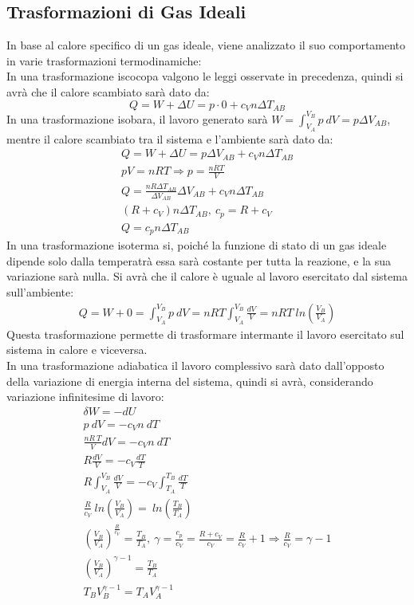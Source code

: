 \documentclass{article}
\numberwithin{equation}{subsection}
\begin{document}
\subsection{Trasformazioni di Gas Ideali}
In base al calore specifico di un gas ideale, viene analizzato 
il suo comportamento in varie trasformazioni termodinamiche:\\
In una trasformazione iscocopa valgono le leggi osservate 
in precedenza, quindi si avrà che il calore scambiato 
sarà dato da: 
\begin{equation}
    Q=W+\Delta  U=p\cdot 0+c_Vn\Delta T_{AB}
\end{equation}
In una trasformazione isobara, il lavoro generato sarà 
$W=\int_{V_A}^{V_B}p\:dV=p\Delta V_{AB}$, mentre il 
calore scambiato tra il sistema e l'ambiente sarà 
dato da: 
\begin{gather}
    Q=W+\Delta U=p\Delta V_{AB}+c_Vn\Delta T_{AB}\\
    pV=nRT\Rightarrow p=\displaystyle\frac{nRT}{V}\\
    Q=\displaystyle\frac{nR\Delta T_{AB}}{\Delta V_{AB}}\Delta V_{AB}+c_Vn\Delta T_{AB}\\
    (R+c_V)n\Delta T_{AB}{,}\:c_p=R+c_V\\
    Q=c_pn\Delta T_{AB}
\end{gather}
In una trasformazione isoterma si, poiché la funzione di 
stato di un gas ideale dipende solo dalla temperatrà essa 
sarà costante per tutta la reazione, e la sua variazione sarà 
nulla. Si avrà che il calore è uguale al lavoro esercitato 
dal sistema sull'ambiente:
\begin{gather}
    Q=W+0=\int_{V_A}^{V_B}p\:dV=nRT\int_{V_A}^{V_B}\displaystyle\frac{dV}{V}=nRT\:ln\left(\displaystyle\frac{V_B}{V_A}\right)
\end{gather}
Questa trasformazione permette di trasformare intermante il 
lavoro esercitato sul sistema in calore e viceversa.\\
In una trasformazione adiabatica il lavoro complessivo 
sarà dato dall'opposto della variazione di energia interna del sistema, 
quindi si avrà, considerando variazione infinitesime di lavoro:
\begin{gather}
    \delta W=-dU\\
    p\:dV=-c_Vn\:dT\\
    \displaystyle\frac{nR\:T}{V}dV=-c_Vn\:dT\\
    \displaystyle R\frac{dV}{V}=-c_V\frac{dT}{T}\\
    \displaystyle R\int_{V_A}^{V_B}\frac{dV}{V}=-c_V\int_{T_A}^{T_B}\frac{dT}{T}\\
    \displaystyle\frac{R}{c_V}\:ln\left(\frac{V_B}{V_A}\right)=\:ln\left(\frac{T_B}{T_A}\right)\\
    \displaystyle\left(\frac{V_B}{V_A}\right)^{\frac{R}{c_V}}=\frac{T_B}{T_A},\:\gamma=\frac{c_p}{c_V}=\frac{R+c_V}{c_V}=\frac{R}{c_V}+1\Rightarrow\frac{R}{c_V}=\gamma-1\\
    \displaystyle\left(\frac{V_B}{V_A}\right)^{\gamma-1}=\frac{T_B}{T_A}\\
    T_BV_B^{\gamma-1}=T_AV_A^{\gamma-1}
\end{gather}
\end{document}
